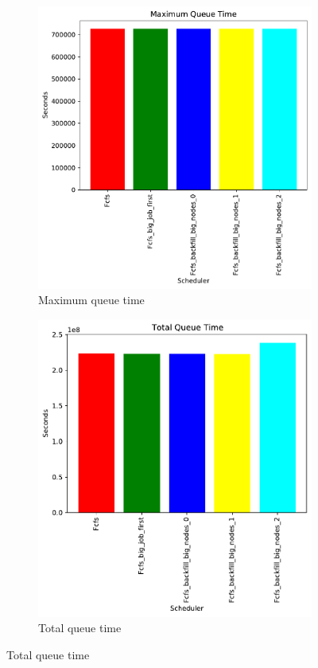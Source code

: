 \documentclass[a4paper]{article}
\begin{document}
	\begin{figure}[H]\centering
	\begin{subfigure}[b]{0.4\linewidth}\centering\includegraphics[width=1\linewidth]{MBSS/plot/Size_Constraint_2022-03-26->2022-03-26_classic_Maximum_queue_time_95_128_4_256_1_1024.pdf}\caption{Maximum queue time}\end{subfigure}
	\begin{subfigure}[b]{0.4\linewidth}\centering\includegraphics[width=1\linewidth]{MBSS/plot/Size_Constraint_2022-03-26->2022-03-26_classic_Total_queue_time_95_128_4_256_1_1024.pdf}\caption{Total queue time}\end{subfigure}

\end{figure}
\end{document}
